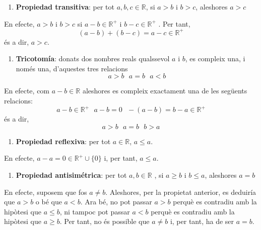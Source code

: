 \begin{enumerate}
\item \textbf{Propiedad transitiva}: per tot $a,b,c\in \mathbb{R}$, si $%
a>b$ i $b>c$, aleshores $a>c$
\end{enumerate}

En efecte, $a>b$ i $b>c$ si $a-b\in \mathbb{R}^{+}$ i $b-c\in \mathbb{R}^{+}$%
. Per tant,%
\begin{equation*}
(a-b)+(b-c)=a-c\in \mathbb{R}^{+}
\end{equation*}%
és a dir, $a>c$.

\begin{enumerate}
\item[2.] \textbf{Tricotomía}: donats dos nombres reals
qualssevol $a$ i $b$, es compleix una, i només una, d’aquestes tres
relacions%
\begin{equation*}
a>b\text{ \ \ \ \ \ \ }a=b\text{ \ \ \ \ \ \ }a<b
\end{equation*}
\end{enumerate}

En efecte, com $a-b\in \mathbb{R}$ aleshores es compleix exactament una de
les següents relacions:%
\begin{equation*}
a-b\in \mathbb{R}^{+}\text{ \ \ \ \ \ \ }a-b=0\text{ \ \ \ \ \ \ }%
-(a-b)=b-a\in \mathbb{R}^{+}
\end{equation*}%
és a dir,%
\begin{equation*}
a>b\text{ \ \ \ \ \ \ }a=b\text{ \ \ \ \ \ \ }b>a
\end{equation*}

\begin{enumerate}
\item[3.] \textbf{Propiedad reflexiva}: per tot $a\in \mathbb{R}$, $a\leq
a$.
\end{enumerate}

En efecte, $a-a=0\in \mathbb{R}^{+}\cup \{0\}$ i, per tant, $a\leq a$.

\begin{enumerate}
\item[4.] \textbf{Propiedad antisimétrica}: per tot $a,b\in \mathbb{R}$%
, si $a\geq b$ i $b\leq a$, aleshores $a=b$
\end{enumerate}

En efecte, suposem que fos $a\neq b$. Aleshores, per la propietat
anterior, es deduiría que $a>b$ o bé que $a<b$. Ara bé, no pot
passar $a>b$ perquè es contradiu amb la hipòtesi que $a\leq b$, ni
tampoc pot passar $a<b$ perquè es contradiu amb la hipòtesi que
\thinspace $a\geq b$. Per tant, no és possible que $a\neq b$ i, per
tant, ha de ser $a=b$.

